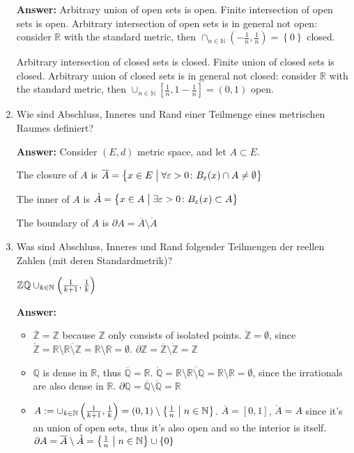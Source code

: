 \documentclass[11pt]{article}
\newcommand{\RR}[0]{\mathbb{R}}
\newcommand{\QQ}[0]{\mathbb{Q}}
\newcommand{\ZZ}[0]{\mathbb{Z}}
\newcommand{\NN}[0]{\mathbb{N}}
\begin{document}
\begin{enumerate}
    \textbf{Answer:} Arbitrary union of open sets is open. Finite intersection of open sets is open. Arbitrary intersection of open sets is in general not open: consider $\RR$ with the standard metric, then $\cap_{n \in \NN} (-\frac{1}{n}, \frac{1}{n}) = \left\{0\right\}$ closed.

    Arbitrary intersection of closed sets is closed. Finite union of closed sets is closed. Arbitrary union of closed sets is in general not closed: consider $\RR$ with the standard metric, then $\cup_{n \in \NN}\left[\frac{1}{n}, 1-\frac{1}{n}\right] = (0, 1)$ open.

    \item Wie sind Abschluss, Inneres und Rand einer Teilmenge eines metrischen Raumes definiert?

    \textbf{Answer:} Consider $(E, d)$ metric space, and let $A \subset E$.

    The closure of $A$ is $\overline{A} = \left\{x \in E \bigm| \forall \varepsilon > 0 \colon B_\varepsilon(x) \cap A \neq \emptyset \right\}$

    The inner of $A$ is $\mathring{A} = \left\{x \in A \bigm| \exists \varepsilon > 0\colon B_\varepsilon(x) \subset A \right\}$

    The boundary of $A$ is $\partial A = \overline{A} \setminus \mathring{A}$
    \item Was sind Abschluss, Inneres und Rand folgender Teilmengen der reellen Zahlen (mit deren Standardmetrik)?


    \hspace*{\fill}
    $\ZZ \hfill \QQ \hfill \cup_{k\in\NN}\left(\frac{1}{k+1}, \frac{1}{k}\right)$
    \hspace*{\fill}

    \textbf{Answer:}
    \begin{itemize}
        \item $\overline{\ZZ} = \ZZ$ because $\ZZ$ only consists of isolated points. $\mathring{\ZZ} = \emptyset$, since $\mathring{\ZZ} = \RR \setminus \overline{\RR \setminus \ZZ} = \RR \setminus \RR = \emptyset$. $\partial \ZZ = \overline{\ZZ} \setminus \mathring{\ZZ} = \ZZ$
        \item $\QQ$ is dense in $\RR$, thus $\overline{\QQ} = \RR$. $\mathring{\QQ} = \RR \setminus \overline{\RR \setminus \QQ} = \RR \setminus \RR = \emptyset$, since the irrationals are also dense in $\RR$. $\partial\QQ = \overline{\QQ} \setminus \mathring{\QQ} = \RR$
        \item $A := \cup_{k\in\NN}\left(\frac{1}{k+1}, \frac{1}{k}\right) = (0, 1) \setminus \left\{\frac{1}{n} \bigm| n \in \NN\right\}$. $\overline{A} = [0, 1]$, $\mathring{A} = A$ since it's an union of open sets, thus it's also open and so the interior is itself. $\partial{A} = \overline{A} \setminus \mathring{A} = \left\{\frac{1}{n} \bigm| n \in \NN\right\} \cup \left\{0\right\}$
    \end{itemize}


\end{enumerate}
\end{document}
